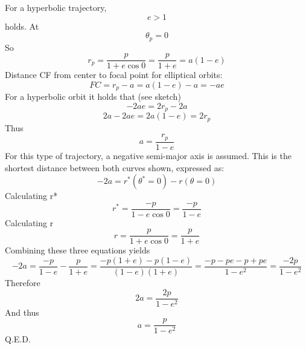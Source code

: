 For a hyperbolic trajectory, 
\begin{equation}
e>1
\end{equation}
holds.
At 
\begin{equation}
\theta_p = 0
\end{equation}
So
\begin{equation}
r_p = \frac{p}{1+e\cos 0} = \frac{p}{1+e} = a(1-e)
\end{equation}
Distance CF from center to focal point for elliptical orbits:
\begin{equation}
FC = r_p - a = a(1-e) - a = - ae
\end{equation}
For a hyperbolic orbit it holds that (see sketch)
\begin{equation}
- 2 ae = 2 r_p - 2 a
\end{equation}
\begin{equation}
2a - 2ae = 2a(1-e) = 2r_p
\end{equation}
Thus
\begin{equation}
a = \frac{r_p}{1-e}
\end{equation}
For this type of trajectory, a negative semi-major axis is assumed. This is the shortest distance between both curves shown, expressed as:
\begin{equation}
-2a = r^*(\theta^* = 0) - r(\theta = 0)
\end{equation}
Calculating r*
\begin{equation}
r^* = \frac{-p}{1-e\cos 0} = \frac{-p}{1-e}
\end{equation}
Calculating r
\begin{equation}
r = \frac{p}{1+e\cos 0} = \frac{p}{1+e}
\end{equation}
Combining these three equations yields
\begin{equation}
-2a = \frac{-p}{1-e} - \frac{p}{1+e} = \frac{-p(1+e) - p(1-e)}{(1-e)(1+e)} = \frac{-p -pe -p +pe}{1-e^2} = \frac{-2p}{1-e^2}
\end{equation}
Therefore
\begin{equation}
2a = \frac{2p}{1-e^2}
\end{equation}
And thus
\begin{equation}
a = \frac{p}{1-e^2}
\end{equation}
Q.E.D.
\clearpage
